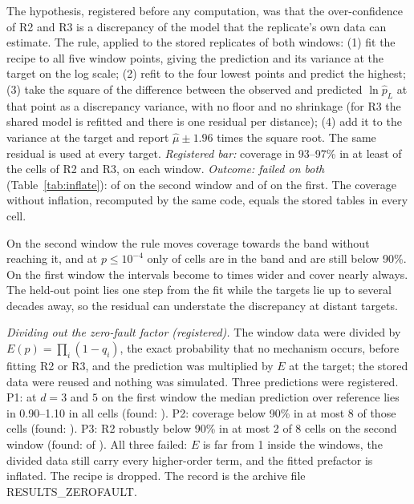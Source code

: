 \documentclass[aps,pre,onecolumn,superscriptaddress,nofootinbib,10pt]{revtex4-2}
\newcommand{\pL}{p_L}
\begin{document}
The hypothesis, registered before any computation, was that the over-confidence of R2 and R3 is a discrepancy of the model that the replicate's own data can estimate. The rule, applied to the stored replicates of both windows: (1) fit the recipe to all five window points, giving the prediction and its variance at the target on the log scale; (2) refit to the four lowest points and predict the highest; (3) take the square of the difference between the observed and predicted $\ln\hat\pL$ at that point as a discrepancy variance, with no floor and no shrinkage (for R3 the shared model is refitted and there is one residual per distance); (4) add it to the variance at the target and report $\hat\mu\pm1.96$ times the square root. The same residual is used at every target. \emph{Registered bar:} coverage in 93--97\% in at least  of the  cells of R2 and R3, on each window. \emph{Outcome: failed on both} (Table~\ref{tab:inflate}):  of  on the second window and  of  on the first. The coverage without inflation, recomputed by the same code, equals the stored tables in every cell.
\begin{table}[htbp]
\caption{Registered. Coverage of R2 and R3 after inflation, in numbers of cells out of 12 per recipe and window; median coverage over those cells in percent, with the value before inflation in brackets; and the median ratio of the inflated to the original interval width on the log scale. R1 with the same inflation is a side check and is not part of the bar.}\label{tab:inflate}

\end{table}
On the second window the rule moves coverage towards the band without reaching it, and at $p\le10^{-4}$ only  of  cells are in the band and  are still below 90\%. On the first window the intervals become  to  times wider and cover nearly always. The held-out point lies one step from the fit while the targets lie up to several decades away, so the residual can understate the discrepancy at distant targets.

\emph{Dividing out the zero-fault factor (registered).} The window data were divided by $E(p)=\prod_i(1-q_i)$, the exact probability that no mechanism occurs, before fitting R2 or R3, and the prediction was multiplied by $E$ at the target; the stored data were reused and nothing was simulated. Three predictions were registered. P1: at $d=3$ and $5$ on the first window the median prediction over reference lies in 0.90--1.10 in all  cells (found: ). P2: coverage below 90\% in at most 8 of those  cells (found: ). P3: R2 robustly below 90\% in at most 2 of 8 cells on the second window (found:  of ). All three failed: $E$ is far from 1 inside the windows, the divided data still carry every higher-order term, and the fitted prefactor is inflated. The recipe is dropped. The record is the archive file RESULTS\_ZEROFAULT.
\end{document}
